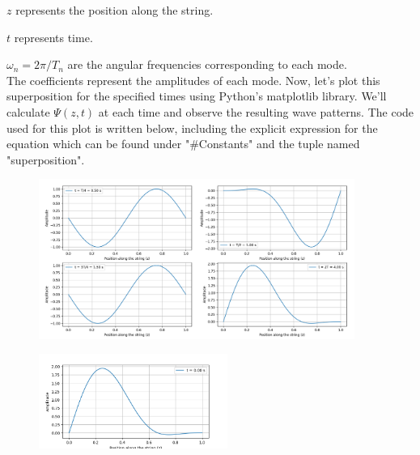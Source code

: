 \documentclass{article}
\begin{document}
    \(z\) represents the position along the string.
    
    \(t\) represents time.
    
    \(\omega_n = 2\pi / T_n\) are the angular frequencies corresponding to each mode.\\
    
\noindent The coefficients represent the amplitudes of each mode. Now, let’s plot this superposition for the specified times using Python’s matplotlib library. We’ll calculate \(\Psi(z, t)\) at each time and observe the resulting wave patterns. The code used for this plot is written below, including the explicit expression for the equation which can be found under "\#Constants" and the tuple named "superposition".
\begin{figure}[h]
    \centering
    \includegraphics[width=0.919\textwidth]{Captura.PNG}
\end{figure}
\clearpage

\begin{figure}[h]
    \centering
    \includegraphics[width=0.55\textwidth]{t0.png}
\end{figure}
\end{document}
